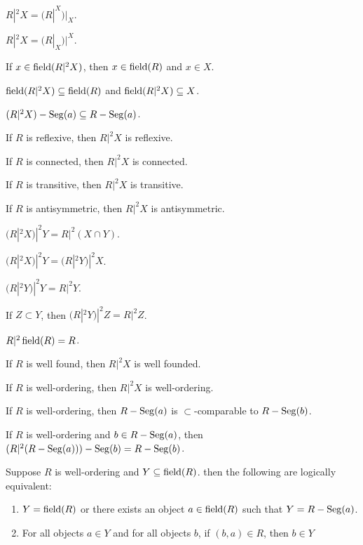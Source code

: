 \documentclass{article}
\begin{document}
\begin{thm}
\item\label{wellord1:10} $R|^{2}X=(R|^{X})|_{X}$.
\item\label{wellord1:11} $R|^{2}X=(R|_{X})|^{X}$.
\item\label{wellord1:12} If $x\in\operatorname{field}(R|^{2}X)$, then $x\in\operatorname{field}(R)$
  and $x\in X$.
\item\label{wellord1:13} $\operatorname{field}(R|^{2}X)\subseteq\operatorname{field}(R)$ and
  $\operatorname{field}(R|^{2}X)\subseteq X$.
\item\label{wellord1:14} $(R|^{2}X)-\operatorname{Seg}(a)\subseteq R-\operatorname{Seg}(a)$.
\item\label{wellord1:15} If $R$ is reflexive, then $R|^{2}X$ is reflexive.
\item\label{wellord1:16} If $R$ is connected, then $R|^{2}X$ is connected.
\item\label{wellord1:17} If $R$ is transitive, then $R|^{2}X$ is transitive.
\item\label{wellord1:18} If $R$ is antisymmetric, then $R|^{2}X$ is antisymmetric.
\item\label{wellord1:19} $(R|^{2}X)|^{2}Y=R|^{2}(X\cap Y)$.
\item\label{wellord1:20} $(R|^{2}X)|^{2}Y=(R|^{2}Y)|^{2}X$.
\item\label{wellord1:21} $(R|^{2}Y)|^{2}Y=R|^{2}Y$.
\item\label{wellord1:22} If $Z\subset Y$, then $(R|^{2}Y)|^{2}Z=R|^{2}Z$.
\item\label{wellord1:23} $R|^{2}\operatorname{field}(R)=R$.
\item\label{wellord1:24} If $R$ is well found, then $R|^{2}X$ is well founded.
\item\label{wellord1:25} If $R$ is well-ordering, then $R|^{2}X$ is well-ordering.
\item\label{wellord1:26} If $R$ is well-ordering, then $R-\operatorname{Seg}(a)$ is
  $\subset$-comparable to $R-\operatorname{Seg}(b)$.
\item\label{wellord1:27} If $R$ is well-ordering and $b\in R-\operatorname{Seg}(a)$,
  then $(R|^{2}(R-\operatorname{Seg}(a)))-\operatorname{Seg}(b)=R-\operatorname{Seg}(b)$.
\item\label{wellord1:28} Suppose $R$ is well-ordering and $Y\subseteq\operatorname{field}(R)$.
  then the following are logically equivalent:
  \begin{enumerate}[label=(\roman*)]
  \item $Y=\operatorname{field}(R)$ or there exists an object $a\in\operatorname{field}(R)$ such
    that $Y=R-\operatorname{Seg}(a)$.
  \item For all objects $a\in Y$ and for all objects $b$, if $(b,a)\in R$,
    then $b\in Y$

\end{enumerate}
\end{thm}
\end{document}
